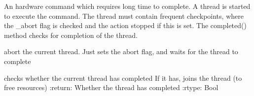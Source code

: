 \documentclass[letterpaper,10pt,english]{sphinxmanual}
\begin{document}
\begin{fulllineitems}
\label{\detokenize{webserverdocs:HardwareThreadedClass.ThreadedHardwareCommand}}
\pysigstartsignatures
{}
\pysigstopsignatures
\sphinxAtStartPar
An hardware command which requires long time to complete.
A thread is started to execute the command. The thread must contain
frequent checkpoints, where the \_abort flag is checked and the
action stopped if this is set.
The completed() method checks for completion of the thread.

\begin{fulllineitems}
\label{\detokenize{webserverdocs:HardwareThreadedClass.ThreadedHardwareCommand.abort}}
\pysigstartsignatures
{}
\pysigstopsignatures
\sphinxAtStartPar
abort the current thread.
Just sets the abort flag, and waits for the thread to complete

\end{fulllineitems}


\begin{fulllineitems}
\label{\detokenize{webserverdocs:HardwareThreadedClass.ThreadedHardwareCommand.completed}}
\pysigstartsignatures
{}
\pysigstopsignatures
\sphinxAtStartPar
checks whether the current thread has completed
If it has, joins the thread (to free resources)
:return: Whether the thread has completed
:rtype: Bool

\end{fulllineitems}



\end{fulllineitems}
\end{document}
